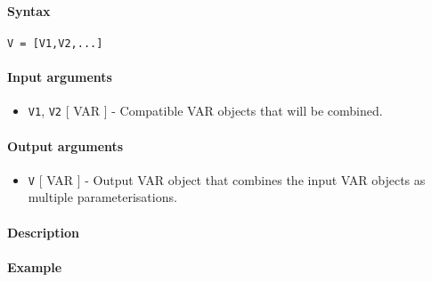 


	\paragraph{Syntax}

\begin{verbatim}
V = [V1,V2,...]
\end{verbatim}

\paragraph{Input arguments}

\begin{itemize}
\itemsep1pt\parskip0pt
\item
  \texttt{V1}, \texttt{V2} {[} VAR {]} - Compatible VAR objects that
  will be combined.
\end{itemize}

\paragraph{Output arguments}

\begin{itemize}
\itemsep1pt\parskip0pt
\item
  \texttt{V} {[} VAR {]} - Output VAR object that combines the input VAR
  objects as multiple parameterisations.
\end{itemize}

\paragraph{Description}

\paragraph{Example}


